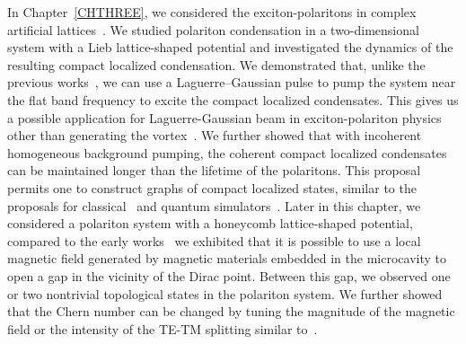 In Chapter~\ref{CHTHREE}, we considered the exciton-polaritons in complex artificial lattices~\cite{Sun:2018aa,Ko:2020aa,Sun:2019ab}.
We studied polariton condensation in a two-dimensional system with a Lieb lattice-shaped potential and investigated the dynamics of the resulting compact localized condensation.
We demonstrated that, unlike the previous works~\cite{Baboux:2016aa,Klembt:2017aa,PhysRevLett.120.097401}, we can use a Laguerre--Gaussian pulse to pump the system near the flat band frequency to excite the compact localized condensates.
This gives us a possible application for Laguerre-Gaussian beam in exciton-polariton physics other than generating the vortex~\cite{Kwon:2019aa}.
We further showed that with incoherent homogeneous background pumping, the coherent compact localized condensates can be maintained longer than the lifetime of the polaritons.
This proposal permits one to construct graphs of compact localized states, similar to the proposals for classical~\cite{Berloff:2017aa} and quantum simulators~\cite{Liew:2018aa,Buluta:2009aa,Georgescu:2014aa}.
Later in this chapter, we considered a polariton system with a honeycomb lattice-shaped potential, compared to the early works~\cite{Bardyn:2015aa,Karzig:2015aa,Klembt:2018aa} we exhibited that it is possible to use a local magnetic field generated by magnetic materials embedded in the microcavity to open a gap in the vicinity of the Dirac point.
Between this gap, we observed one or two nontrivial topological states in the polariton system.
We further showed that the Chern number can be changed by tuning the magnitude of the magnetic field or the intensity of the TE-TM splitting similar to~\cite{Nalitov:2015aa,Bleu:2016aa}.
